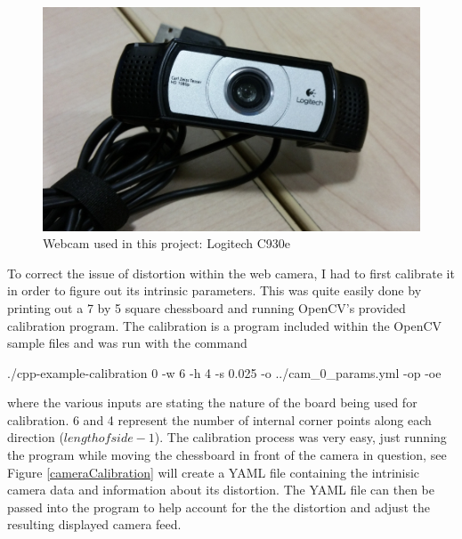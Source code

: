\documentclass[11pt]{article}
\begin{document}
\begin{figure}
	\centering
	\includegraphics[scale=0.6]{pics/camera.jpg}
	\caption{Webcam used in this project: Logitech C930e}
	\label{webcam}
\end{figure}

To correct the issue of distortion within the web camera, I had to first calibrate
it in order to figure out its intrinsic parameters. This was
quite easily done by printing out a 7 by 5 square chessboard and running
OpenCV's provided calibration program. The calibration is a program included
within the OpenCV sample files and was run with the command

./cpp-example-calibration 0 -w 6 -h 4 -s 0.025 -o ../cam\_0\_params.yml -op -oe

where the various inputs are stating the nature of the board being used
for calibration. 6 and 4 represent the number of internal corner points along
each direction ($length of side -1$). The calibration process was very easy,
just running the program while moving the chessboard in front of the
camera in question, see Figure \ref{cameraCalibration} will create 
a YAML file containing the intrinisic camera data and information 
about its distortion. The YAML file can then be passed into the program to
help account for the the distortion and adjust the resulting displayed 
camera feed.
\end{document}
